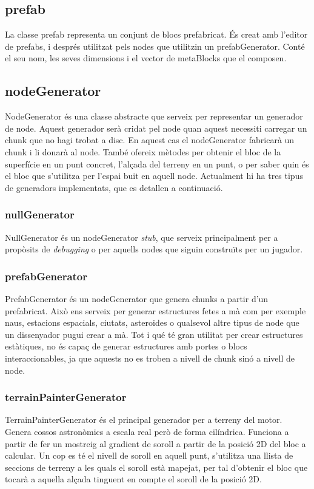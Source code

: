 \subsection{prefab}
La classe prefab representa un conjunt de blocs prefabricat. És creat amb l'editor de prefabs, i després utilitzat pels nodes que utilitzin un prefabGenerator. Conté el seu nom, les seves dimensions i el vector de metaBlocks que el composen.
\subsection{nodeGenerator}
NodeGenerator és una classe abstracte que serveix per representar un generador de node. Aquest generador serà cridat pel node quan aquest necessiti carregar un chunk que no hagi trobat a disc. En aquest cas el nodeGenerator fabricarà un chunk i li donarà al node. També ofereix mètodes per obtenir el bloc de la superfície en un punt concret, l'alçada del terreny en un punt, o per saber quin és el bloc que s'utilitza per l'espai buit en aquell node.
Actualment hi ha tres tipus de generadors implementats, que es detallen a continuació.
\subsubsection{nullGenerator}
NullGenerator és un nodeGenerator \textit{stub}, que serveix principalment per a propòsits de \textit{debugging} o per aquells nodes que siguin construïts per un jugador.
\subsubsection{prefabGenerator}
PrefabGenerator és un nodeGenerator que genera chunks a partir d'un prefabricat. Això ens serveix per generar estructures fetes a mà com per exemple naus, estacions espacials, ciutats, asteroides o qualsevol altre tipus de node que un dissenyador pugui crear a mà.
Tot i qué té gran utilitat per crear estructures estàtiques, no és capaç de generar estructures amb portes o blocs interaccionables, ja que aquests no es troben a nivell de chunk sinó a nivell de node.
\subsubsection{terrainPainterGenerator}
TerrainPainterGenerator és el principal generador per a terreny del motor. Genera cossos astronòmics a escala real però de forma cilíndrica.
Funciona a partir de fer un mostreig al gradient de soroll a partir de la posició 2D del bloc a calcular. Un cop es té el nivell de soroll en aquell punt, s'utilitza una llista de seccions de terreny a les quals el soroll està mapejat, per tal d'obtenir el bloc que tocarà a aquella alçada tinguent en compte el soroll de la posició 2D.


